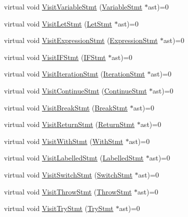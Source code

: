 \begin{DoxyCompactItemize}
virtual void \hyperlink{classmocha_1_1_i_visitor_ad9ba0968fae935fdd227f2064c40c80b}{VisitVariableStmt} (\hyperlink{classmocha_1_1_variable_stmt}{VariableStmt} $\ast$ast)=0
\item 
virtual void \hyperlink{classmocha_1_1_i_visitor_a3f51f3ec3e7593002ef739d0aa45c241}{VisitLetStmt} (\hyperlink{classmocha_1_1_let_stmt}{LetStmt} $\ast$ast)=0
\item 
virtual void \hyperlink{classmocha_1_1_i_visitor_a3ea1beb8dc7ec0f2990e24f117b847ac}{VisitExpressionStmt} (\hyperlink{classmocha_1_1_expression_stmt}{ExpressionStmt} $\ast$ast)=0
\item 
virtual void \hyperlink{classmocha_1_1_i_visitor_a7374671e3df04b32e8ee01fc5e4865af}{VisitIFStmt} (\hyperlink{classmocha_1_1_i_f_stmt}{IFStmt} $\ast$ast)=0
\item 
virtual void \hyperlink{classmocha_1_1_i_visitor_aa2a5f40ce8afbeccf1559a946f7b953f}{VisitIterationStmt} (\hyperlink{classmocha_1_1_iteration_stmt}{IterationStmt} $\ast$ast)=0
\item 
virtual void \hyperlink{classmocha_1_1_i_visitor_a6b87aadb5d466ca2cad51299b7008301}{VisitContinueStmt} (\hyperlink{classmocha_1_1_continue_stmt}{ContinueStmt} $\ast$ast)=0
\item 
virtual void \hyperlink{classmocha_1_1_i_visitor_a678237b1a033d140d857486827e1a877}{VisitBreakStmt} (\hyperlink{classmocha_1_1_break_stmt}{BreakStmt} $\ast$ast)=0
\item 
virtual void \hyperlink{classmocha_1_1_i_visitor_a751c80da8a09525ca8c3cfeb1d954280}{VisitReturnStmt} (\hyperlink{classmocha_1_1_return_stmt}{ReturnStmt} $\ast$ast)=0
\item 
virtual void \hyperlink{classmocha_1_1_i_visitor_aab4897ea3cedb5fadb182af0b5afebb0}{VisitWithStmt} (\hyperlink{classmocha_1_1_with_stmt}{WithStmt} $\ast$ast)=0
\item 
virtual void \hyperlink{classmocha_1_1_i_visitor_adc9f48eae53dc6e36013e833dc9fc85a}{VisitLabelledStmt} (\hyperlink{classmocha_1_1_labelled_stmt}{LabelledStmt} $\ast$ast)=0
\item 
virtual void \hyperlink{classmocha_1_1_i_visitor_a2aea1fb87ae2ab0bfb886da0a8b25e45}{VisitSwitchStmt} (\hyperlink{classmocha_1_1_switch_stmt}{SwitchStmt} $\ast$ast)=0
\item 
virtual void \hyperlink{classmocha_1_1_i_visitor_a8acc50ed1e2a4607e44fd017ccd64086}{VisitThrowStmt} (\hyperlink{classmocha_1_1_throw_stmt}{ThrowStmt} $\ast$ast)=0
\item 
virtual void \hyperlink{classmocha_1_1_i_visitor_ae323c8861655438a63c7fa3ecda056dd}{VisitTryStmt} (\hyperlink{classmocha_1_1_try_stmt}{TryStmt} $\ast$ast)=0

\end{DoxyCompactItemize}
